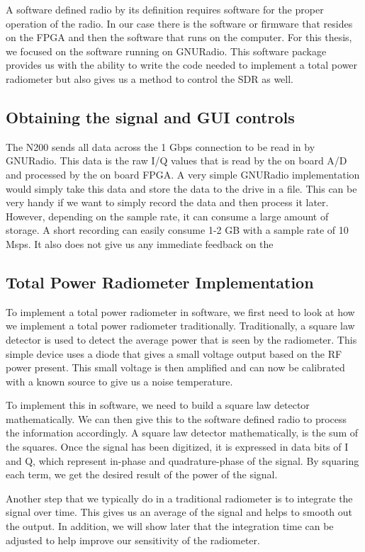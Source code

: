 A software defined radio by its definition requires software for the proper operation of the radio.  In our case there is the software or firmware that resides on the FPGA and then the software that runs on the computer.  For this thesis, we focused on the software running on GNURadio.  This software package provides us with the ability to write the code needed to implement a total power radiometer but also gives us a method to control the SDR as well.  

\subsection{Obtaining the signal and GUI controls}

The N200 sends all data across the 1 Gbps connection to be read in by GNURadio.  This data is the raw I/Q values that is read by the on board A/D and processed by the on board FPGA.  A very simple GNURadio implementation would simply take this data and store the data to the drive in a file.  This can be very handy if we want to simply record the data and then process it later.  However, depending on the sample rate, it can consume a large amount of storage.  A short recording can easily consume 1-2 GB with a sample rate of 10 Msps.  It also does not give us any immediate feedback on the 

\subsection{Total Power Radiometer Implementation}
To implement a total power radiometer in software, we first need to look at how we implement a total power radiometer traditionally.  Traditionally, a square law detector is used to detect the average power that is seen by the radiometer.  This simple device uses a diode that gives a small voltage output based on the RF power present.  This small voltage is then amplified and can now be calibrated with a known source to give us a noise temperature.  

To implement this in software, we need to build a square law detector mathematically.  We can then give this to the software defined radio to process the information accordingly.  A square law detector mathematically, is the sum of the squares.  Once the signal has been digitized, it is expressed in data bits of I and Q, which represent in-phase and quadrature-phase of the signal.  By squaring each term, we get the desired result of the power of the signal.

Another step that we typically do in a traditional radiometer is to integrate the signal over time.  This gives us an average of the signal and helps to smooth out the output.  In addition, we will show later that the integration time can be adjusted to help improve our sensitivity of the radiometer.

